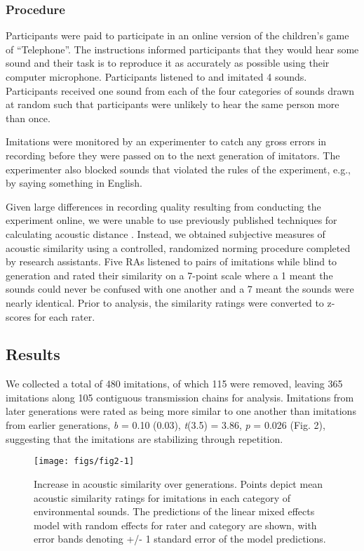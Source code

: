 \documentclass[10pt,letterpaper]{article}
\begin{document}
\subsubsection{Procedure}\label{procedure}

Participants were paid to participate in an online version of the
children's game of ``Telephone''. The instructions informed participants
that they would hear some sound and their task is to reproduce it as
accurately as possible using their computer microphone. Participants
listened to and imitated 4 sounds. Participants received one sound from
each of the four categories of sounds drawn at random such that
participants were unlikely to hear the same person more than once.

Imitations were monitored by an experimenter to catch any gross errors
in recording before they were passed on to the next generation of
imitators. The experimenter also blocked sounds that violated the rules
of the experiment, e.g., by saying something in English.

Given large differences in recording quality resulting from conducting
the experiment online, we were unable to use previously published
techniques for calculating acoustic distance
\citep[cf.][]{Lemaitre:2016kz}. Instead, we obtained subjective measures
of acoustic similarity using a controlled, randomized norming procedure
completed by research assistants. Five RAs listened to pairs of
imitations while blind to generation and rated their similarity on a
7-point scale where a 1 meant the sounds could never be confused with
one another and a 7 meant the sounds were nearly identical. Prior to
analysis, the similarity ratings were converted to z-scores for each
rater.

\subsection{Results}\label{results}

We collected a total of 480 imitations, of which 115 were removed,
leaving 365 imitations along 105 contiguous transmission chains for
analysis. Imitations from later generations were rated as being more
similar to one another than imitations from earlier generations,
\emph{b} = 0.10 (0.03), \emph{t}(3.5) = 3.86, \emph{p} = 0.026 (Fig. 2),
suggesting that the imitations are stabilizing through repetition.

\begin{figure}
\texttt{[image: figs/fig2-1]} \caption{Increase in acoustic similarity over generations. Points depict mean acoustic similarity ratings for imitations in each category of environmental sounds. The predictions of the linear mixed effects model with random effects for rater and category are shown, with error bands denoting +/- 1 standard error of the model predictions.}\label{fig:fig2}
\end{figure}
\end{document}
